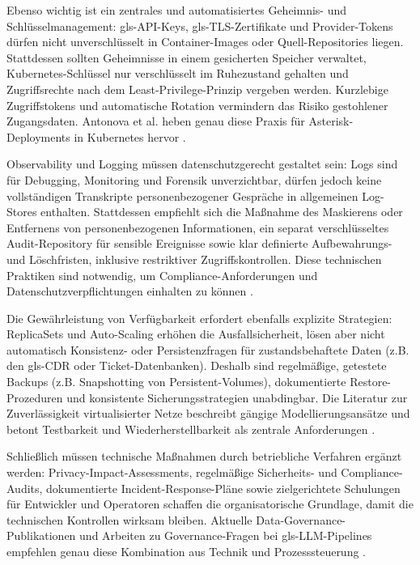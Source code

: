 Ebenso wichtig ist ein zentrales und automatisiertes Geheimnis- und
Schlüsselmanagement: \gls{gls-API}-Keys, \gls{gls-TLS}-Zertifikate und Provider-Tokens dürfen nicht unverschlüsselt in Container-Images oder Quell-Repositories liegen. Stattdessen sollten Geheimnisse in einem gesicherten Speicher verwaltet, Kubernetes-Schlüssel nur verschlüsselt im Ruhezustand gehalten und Zugriffsrechte nach dem Least-Privilege-Prinzip vergeben werden. Kurzlebige Zugriffstokens und automatische Rotation vermindern das Risiko gestohlener Zugangsdaten. Antonova et al. heben genau diese Praxis für Asterisk-Deployments in Kubernetes hervor \parencite{Antonova2025}.

Observability und Logging müssen datenschutzgerecht gestaltet sein: Logs sind für Debugging, Monitoring und Forensik unverzichtbar, dürfen jedoch keine vollständigen Transkripte personenbezogener Gespräche in allgemeinen Log-Stores enthalten. Stattdessen empfiehlt sich die Ma\ss nahme des Maskierens oder Entfernens von personenbezogenen Informationen, ein separat verschlüsseltes Audit-Repository für sensible Ereignisse sowie klar definierte Aufbewahrungs- und Löschfristen, inklusive restriktiver Zugriffskontrollen. Diese technischen Praktiken sind notwendig, um Compliance-Anforderungen und Datenschutzverpflichtungen einhalten zu können \parencite{Data2025_AIDataQuality}.

Die Gewährleistung von Verfügbarkeit erfordert ebenfalls explizite Strategien: ReplicaSets und Auto-Scaling erhöhen die Ausfallsicherheit, lösen aber nicht automatisch Konsistenz- oder Persistenzfragen für zustandsbehaftete Daten (z.B. den \gls{gls-CDR} oder Ticket-Datenbanken). Deshalb sind regelmä\ss ige, getestete Backups (z.B. Snapshotting von Persistent-Volumes), dokumentierte Restore-Prozeduren und konsistente Sicherungsstrategien unabdingbar. Die Literatur zur Zuverlässigkeit virtualisierter Netze beschreibt gängige Modellierungsansätze und betont Testbarkeit und Wiederherstellbarkeit als zentrale Anforderungen \parencite{ReliabilityVirtualizedNetworks}.

Schlie\ss lich müssen technische Ma\ss nahmen durch betriebliche Verfahren ergänzt werden: Privacy-Impact-Assessments, regelmä\ss ige Sicherheits- und Compliance-Audits, dokumentierte Incident-Response-Pläne sowie zielgerichtete Schulungen für Entwickler und Operatoren schaffen die organisatorische Grundlage, damit die technischen Kontrollen wirksam bleiben. Aktuelle Data-Governance-Publikationen und Arbeiten zu Governance-Fragen bei \gls{gls-LLM}-Pipelines empfehlen genau diese Kombination aus Technik und Prozesssteuerung \parencite{Data2025_AIDataQuality,ssrn5348245}.

